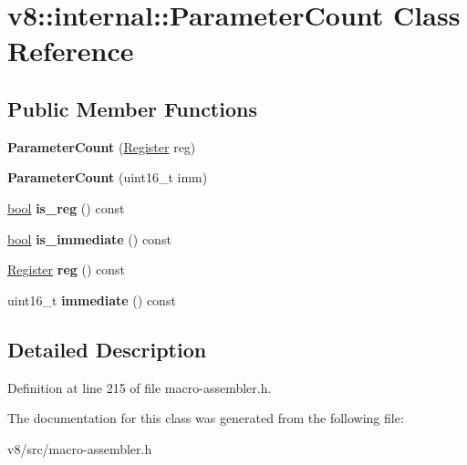 \hypertarget{classv8_1_1internal_1_1ParameterCount}{}\section{v8\+:\+:internal\+:\+:Parameter\+Count Class Reference}
\label{classv8_1_1internal_1_1ParameterCount}
\subsection*{Public Member Functions}
\begin{DoxyCompactItemize}
\item 
\mbox{\label{classv8_1_1internal_1_1ParameterCount_a4c07e6e590254b0cbf9e909bd1b36c79}} 
{\bfseries Parameter\+Count} (\mbox{\hyperlink{classv8_1_1internal_1_1Register}{Register}} reg)
\item 
\mbox{\label{classv8_1_1internal_1_1ParameterCount_aade01b66f75444a5b9ea142941716408}} 
{\bfseries Parameter\+Count} (uint16\+\_\+t imm)
\item 
\mbox{\label{classv8_1_1internal_1_1ParameterCount_a4a873f55b125d8ff63db24cf7c46ce08}} 
\mbox{\hyperlink{classbool}{bool}} {\bfseries is\+\_\+reg} () const
\item 
\mbox{\label{classv8_1_1internal_1_1ParameterCount_a95980f9daf5c4ddb08b8603ae31e1e52}} 
\mbox{\hyperlink{classbool}{bool}} {\bfseries is\+\_\+immediate} () const
\item 
\mbox{\label{classv8_1_1internal_1_1ParameterCount_a3ea9bf713c408cc61fe9d427bfd6ba9c}} 
\mbox{\hyperlink{classv8_1_1internal_1_1Register}{Register}} {\bfseries reg} () const
\item 
\mbox{\label{classv8_1_1internal_1_1ParameterCount_a7643f2c35b41040b6ffe8709cdc8ea34}} 
uint16\+\_\+t {\bfseries immediate} () const
\end{DoxyCompactItemize}


\subsection{Detailed Description}


Definition at line 215 of file macro-\/assembler.\+h.



The documentation for this class was generated from the following file\+:\begin{DoxyCompactItemize}
\item 
v8/src/macro-\/assembler.\+h\end{DoxyCompactItemize}
